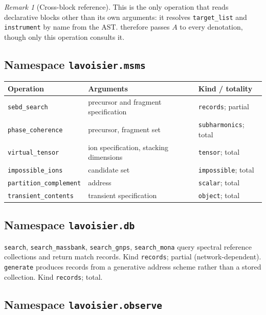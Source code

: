 \documentclass[11pt,twocolumn,a4paper]{article}
\theoremstyle{ssthm}
\theoremstyle{definition}
\theoremstyle{remark}
\newtheorem{remark}[theorem]{Remark}
\newcommand{\shk}[1]{\texttt{#1}}
\begin{document}
\begin{remark}[Cross-block reference]
\label{rem:crossblock}
This is the only operation that reads declarative blocks other than its
own arguments: it resolves \shk{target\_list} and \shk{instrument} by name
from the AST.  therefore passes $A$ to every denotation,
though only this operation consults it.
\end{remark}

\subsection{Namespace \shk{lavoisier.msms}}

\begin{longtable}{@{}p{}p{}p{}@{}}
\toprule
\textbf{Operation} & \textbf{Arguments} & \textbf{Kind / totality}\\
\midrule
\endhead
\shk{sebd\_search} & precursor and fragment specification & \shk{records}; partial\\
\shk{phase\_coherence} & precursor, fragment set & \shk{subharmonics}; total\\
\shk{virtual\_tensor} & ion specification, stacking dimensions & \shk{tensor}; total\\
\shk{impossible\_ions} & candidate set & \shk{impossible}; total\\
\shk{partition\_complement} & address & \shk{scalar}; total\\
\shk{transient\_contents} & transient specification & \shk{object}; total\\
\bottomrule
\end{longtable}

\subsection{Namespace \shk{lavoisier.db}}

\shk{search}, \shk{search\_massbank}, \shk{search\_gnps}, \shk{search\_mona}
query spectral reference collections
\citep{horai2010massbank,wang2016gnps} and return match records. Kind
\shk{records}; partial (network-dependent). \shk{generate} produces
records from a generative address scheme rather than a stored
collection. Kind \shk{records}; total.

\subsection{Namespace \shk{lavoisier.observe}}
\end{document}
